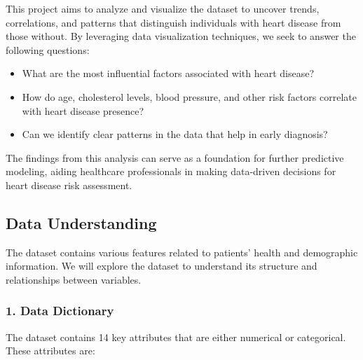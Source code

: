 \documentclass[
]{article}
\begin{document}
This project aims to analyze and visualize the dataset to uncover
trends, correlations, and patterns that distinguish individuals with
heart disease from those without. By leveraging data visualization
techniques, we seek to answer the following questions:

\begin{itemize}
\item
  What are the most influential factors associated with heart disease?
\item
  How do age, cholesterol levels, blood pressure, and other risk factors
  correlate with heart disease presence?
\item
  Can we identify clear patterns in the data that help in early
  diagnosis?
\end{itemize}

The findings from this analysis can serve as a foundation for further
predictive modeling, aiding healthcare professionals in making
data-driven decisions for heart disease risk assessment.

\subsection{\texorpdfstring{\textbf{Data
Understanding}}{Data Understanding}}\label{data-understanding}

The dataset contains various features related to patients' health and
demographic information. We will explore the dataset to understand its
structure and relationships between variables.

\subsubsection{\texorpdfstring{\textbf{1. Data
Dictionary}}{1. Data Dictionary}}\label{data-dictionary}

The dataset contains 14 key attributes that are either numerical or
categorical. These attributes are:
\end{document}
